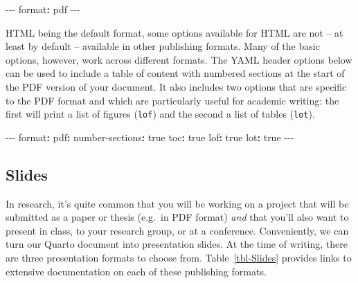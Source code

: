 \documentclass[
  letterpaper,
  DIV=11,
  numbers=noendperiod]{scrreprt}
\newenvironment{Shaded}{\begin{snugshade}}{\end{snugshade}}
\newcommand{\AttributeTok}[1]{\textcolor[rgb]{0.40,0.45,0.13}{#1}}
\newcommand{\CharTok}[1]{\textcolor[rgb]{0.13,0.47,0.30}{#1}}
\newcommand{\FunctionTok}[1]{\textcolor[rgb]{0.28,0.35,0.67}{#1}}
\newcommand{\KeywordTok}[1]{\textcolor[rgb]{0.00,0.23,0.31}{\textbf{#1}}}
\newcommand{\PreprocessorTok}[1]{\textcolor[rgb]{0.68,0.00,0.00}{#1}}
\begin{document}
\begin{Shaded}
\begin{Highlighting}[]
\PreprocessorTok{{-}{-}{-}}
\FunctionTok{format}\KeywordTok{:}\AttributeTok{ pdf}
\PreprocessorTok{{-}{-}{-}}
\end{Highlighting}
\end{Shaded}

HTML being the default format, some options available for HTML are not
-- at least by default -- available in other publishing formats. Many of
the basic options, however, work across different formats. The YAML
header options below can be used to include a table of content with
numbered sections at the start of the PDF version of your document. It
also includes two options that are specific to the PDF format and which
are particularly useful for academic writing: the first will print a
list of figures (\texttt{lof}) and the second a list of tables
(\texttt{lot}).

\begin{Shaded}
\begin{Highlighting}[]
\PreprocessorTok{{-}{-}{-}}
\FunctionTok{format}\KeywordTok{:}\AttributeTok{  }
\AttributeTok{  }\FunctionTok{pdf}\KeywordTok{:}
\AttributeTok{    }\FunctionTok{number{-}sections}\KeywordTok{:}\AttributeTok{ }\CharTok{true}
\AttributeTok{    }\FunctionTok{toc}\KeywordTok{:}\AttributeTok{ }\CharTok{true}
\AttributeTok{    }\FunctionTok{lof}\KeywordTok{:}\AttributeTok{ }\CharTok{true}
\AttributeTok{    }\FunctionTok{lot}\KeywordTok{:}\AttributeTok{ }\CharTok{true}
\PreprocessorTok{{-}{-}{-}    }
\end{Highlighting}
\end{Shaded}

\subsection{Slides}\label{sec-Slides}

In research, it's quite common that you will be working on a project
that will be submitted as a paper or thesis (e.g.~in PDF format)
\emph{and} that you'll also want to present in class, to your research
group, or at a conference. Conveniently, we can turn our Quarto document
into presentation slides. At the time of writing, there are three
presentation formats to choose from. Table~\ref{tbl-Slides} provides
links to extensive documentation on each of these publishing formats.
\end{document}
